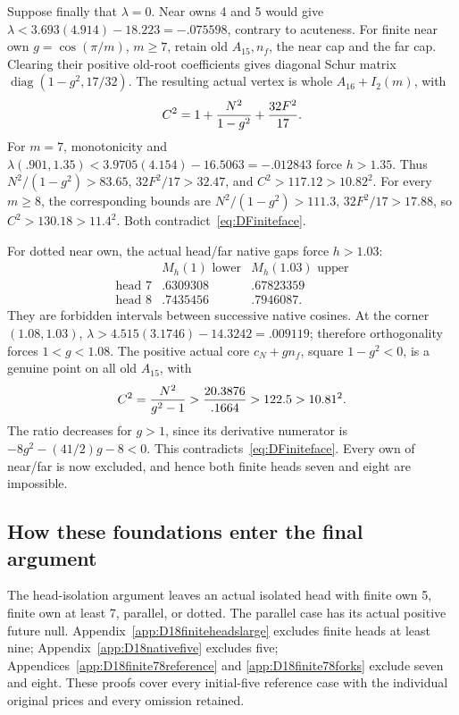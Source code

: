 \documentclass[11pt]{article}
\theoremstyle{definition}
\theoremstyle{remark}
\begin{document}
Suppose finally that \(\lambda=0\).
Near owns 4 and 5 would give
\(\lambda<3.693(4.914)-18.223=-.075598\),
contrary to acuteness.
For finite near own \(g=\cos(\pi/m)\), \(m\ge7\),
retain old \(A_{15},n_f\), the near cap and the far cap.
Clearing their positive old-root coefficients gives diagonal
Schur matrix \(\operatorname{diag}(1-g^2,17/32)\).
The resulting actual vertex is whole \(A_{16}+I_2(m)\), with
\[
                C^2=1+{N^2\over1-g^2}+{32F^2\over17}.
\]
For \(m=7\), monotonicity and
\(\lambda(.901,1.35)<3.9705(4.154)-16.5063=-.012843\)
force \(h>1.35\).  Thus \(N^2/(1-g^2)>83.65\),
\(32F^2/17>32.47\), and \(C^2>117.12>10.82^2\).
For every \(m\ge8\), the corresponding bounds are
\(N^2/(1-g^2)>111.3\), \(32F^2/17>17.88\),
so \(C^2>130.18>11.4^2\).
Both contradict~\eqref{eq:DFiniteface}.

For dotted near own, the actual head/far native gaps force
\(h>1.03\):
\[
 \begin{array}{c|cc}
 &M_h(1)\text{ lower}&M_h(1.03)\text{ upper}\\ \hline
 \text{head }7&.6309308&.67823359\\
 \text{head }8&.7435456&.7946087 .
 \end{array}
\]
They are forbidden intervals between successive native cosines.
At the corner \((1.08,1.03)\),
\(\lambda>4.515(3.1746)-14.3242=.009119\);
therefore orthogonality forces \(1<g<1.08\).
The positive actual core \(c_N+gn_f\), square \(1-g^2<0\),
is a genuine point on all old \(A_{15}\), with
\[
 C^2={N^2\over g^2-1}>
 {20.3876\over.1664}>122.5>10.81^2 .
\]
The ratio decreases for \(g>1\), since its derivative numerator
is \(-8g^2-(41/2)g-8<0\).
This contradicts~\eqref{eq:DFiniteface}.
Every own of near/far is now excluded, and hence both finite
heads seven and eight are impossible.

\subsection{How these foundations enter the final argument}
\label{app:D18foundationcomposition}

The head-isolation argument leaves an actual isolated head with
finite own 5, finite own at least 7, parallel, or dotted.
The parallel case has its actual positive future null.
Appendix~\ref{app:D18finiteheadslarge} excludes finite heads
at least nine; Appendix~\ref{app:D18nativefive} excludes five;
Appendices~\ref{app:D18finite78reference} and
\ref{app:D18finite78forks} exclude seven and eight.
These proofs cover every initial-five reference case with the
individual original prices and every omission retained.
\end{document}
